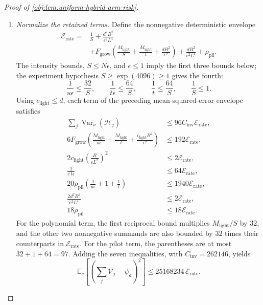 \documentclass[11pt]{article}
\begin{document}
\begin{proof}[Proof of \cref{obj:lem:uniform-hybrid-arm-risk}]
\begin{enumerate}
\item \textit{Normalize the retained terms.}
Define the nonnegative deterministic envelope
\[
\begin{aligned}
\mathscr E_{\mathrm{rate}}
={}&
\frac1S+\frac{d^2B^2}{\epsilon^2L^4}\\
&+F_{\mathrm{grow}}
\left(
\frac{M_{\mathrm{light}}}{S}
+\frac{M_{\mathrm{light}}}{t}
+\frac{dB^2}{\epsilon^2}
\right)
+\frac{dB^2}{\epsilon^2L^4}
+\rho_{\mathrm{pil}}.
\end{aligned}
\]
The intensity bounds, \(S\le N\epsilon\), and \(\epsilon\le1\) imply the first three bounds below; the experiment hypothesis \(S\ge\exp(4096)\ge1\) gives the fourth:
\[
\frac1{u\epsilon}\le\frac{32}{S},
\qquad
\frac1{t\epsilon}\le\frac{64}{S},
\qquad
\frac1t\le\frac{64}{S},
\qquad
\frac1S\le1.
\]
Using \(c_{\mathrm{light}}\le d\), each term of the preceding mean-squared-error envelope satisfies
\[
\begin{aligned}
\sum_j\operatorname{Var}_\nu(\mathcal H_j)
&\le96C_{\mathrm{inv}}\mathscr E_{\mathrm{rate}},\\
6F_{\mathrm{grow}}
\left(
\frac{M_{\mathrm{light}}}{u\epsilon}
+\frac{M_{\mathrm{light}}}{t}
+\frac{c_{\mathrm{light}}B^2}{\epsilon^2}
\right)
&\le192\mathscr E_{\mathrm{rate}},\\
2c_{\mathrm{light}}
\left(\frac B{\epsilon L^2}\right)^2
&\le2\mathscr E_{\mathrm{rate}},\\
\frac1{e\,t\epsilon}
&\le64\mathscr E_{\mathrm{rate}},\\
20\rho_{\mathrm{pil}}
\left(\frac1{u\epsilon}+1+\frac1t\right)
&\le1940\mathscr E_{\mathrm{rate}},\\
\frac{2d^2B^2}{\epsilon^2L^4}
&\le2\mathscr E_{\mathrm{rate}},\\
18\rho_{\mathrm{pil}}
&\le18\mathscr E_{\mathrm{rate}}.
\end{aligned}
\]
For the polynomial term, the first reciprocal bound multiplies
\(M_{\mathrm{light}}/S\) by \(32\), and the other two nonnegative summands are also bounded by \(32\) times their counterparts in \(\mathscr E_{\mathrm{rate}}\).
For the pilot term, the parentheses are at most \(32+1+64=97\).
Adding the seven inequalities, with \(C_{\mathrm{inv}}=262146\), yields
\[
\mathbb E_\nu\left[
\left(\sum_j\mathcal V_j-\psi_a\right)^2
\right]
\le25168234\,\mathscr E_{\mathrm{rate}}.
\]


\end{enumerate}
\end{proof}
\end{document}
